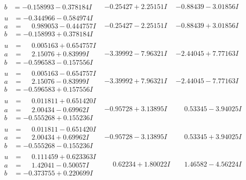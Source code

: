 \documentclass[1p]{elsarticle_modified}
\theoremstyle{definition}
\begin{document}
$$\begin{array}{c|c|c}
\begin{aligned}
b &= -0.158993 - 0.378184 I\end{aligned}
 & -0.25427 + 2.25151 I & -0.88439 - 3.01856 I \\ \hline\begin{aligned}
u &= -0.344966 - 0.584974 I \\
a &= \phantom{-}0.989053 - 0.444757 I \\
b &= -0.158993 + 0.378184 I\end{aligned}
 & -0.25427 - 2.25151 I & -0.88439 + 3.01856 I \\ \hline\begin{aligned}
u &= \phantom{-}0.005163 + 0.654757 I \\
a &= \phantom{-}2.15076 + 0.83999 I \\
b &= -0.596583 - 0.157556 I\end{aligned}
 & -3.39992 - 7.96321 I & -2.44045 + 7.77163 I \\ \hline\begin{aligned}
u &= \phantom{-}0.005163 - 0.654757 I \\
a &= \phantom{-}2.15076 - 0.83999 I \\
b &= -0.596583 + 0.157556 I\end{aligned}
 & -3.39992 + 7.96321 I & -2.44045 - 7.77163 I \\ \hline\begin{aligned}
u &= \phantom{-}0.011811 + 0.651420 I \\
a &= \phantom{-}2.00434 - 0.69962 I \\
b &= -0.555268 + 0.155236 I\end{aligned}
 & -0.95728 + 3.13895 I & \phantom{-}0.53345 - 3.94025 I \\ \hline\begin{aligned}
u &= \phantom{-}0.011811 - 0.651420 I \\
a &= \phantom{-}2.00434 + 0.69962 I \\
b &= -0.555268 - 0.155236 I\end{aligned}
 & -0.95728 - 3.13895 I & \phantom{-}0.53345 + 3.94025 I \\ \hline\begin{aligned}
u &= \phantom{-}0.111459 + 0.623363 I \\
a &= \phantom{-}1.42041 - 0.50057 I \\
b &= -0.373755 + 0.220699 I\end{aligned}
 & \phantom{-}0.62234 + 1.80022 I & \phantom{-}1.46582 - 4.56224 I \\ \hline\begin{aligned}

\end{aligned}
\end{array}$$
\end{document}
